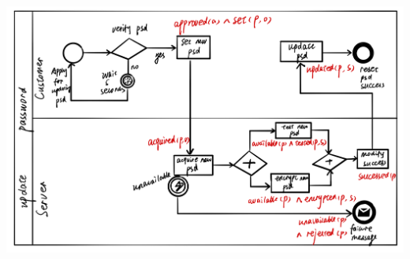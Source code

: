 \documentclass[11pt]{article}
\begin{document}
\begin{enumerate}
\includegraphics[scale=0.3]{Figure4-4.jpeg}


\end{enumerate}
\end{document}
